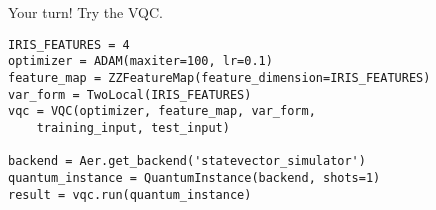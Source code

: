 \begin{frame}[fragile]{Your turn!}
Try the VQC. \bigskip

\begin{verbatim}
IRIS_FEATURES = 4
optimizer = ADAM(maxiter=100, lr=0.1)
feature_map = ZZFeatureMap(feature_dimension=IRIS_FEATURES)
var_form = TwoLocal(IRIS_FEATURES)
vqc = VQC(optimizer, feature_map, var_form, 
    training_input, test_input)

backend = Aer.get_backend('statevector_simulator')
quantum_instance = QuantumInstance(backend, shots=1)
result = vqc.run(quantum_instance)
\end{verbatim}
\end{frame}





